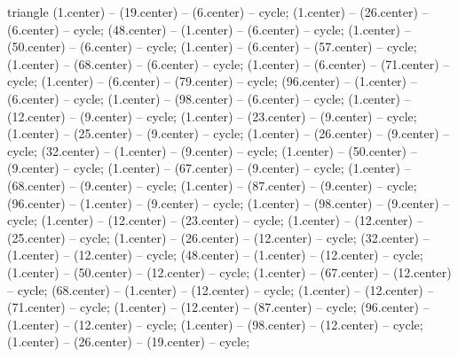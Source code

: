 \begin{pgfonlayer}{triangle} 
 (1.center) -- (19.center) -- (6.center) -- cycle; 
 (1.center) -- (26.center) -- (6.center) -- cycle; 
 (48.center) -- (1.center) -- (6.center) -- cycle; 
 (1.center) -- (50.center) -- (6.center) -- cycle; 
 (1.center) -- (6.center) -- (57.center) -- cycle; 
 (1.center) -- (68.center) -- (6.center) -- cycle; 
 (1.center) -- (6.center) -- (71.center) -- cycle; 
 (1.center) -- (6.center) -- (79.center) -- cycle; 
 (96.center) -- (1.center) -- (6.center) -- cycle; 
 (1.center) -- (98.center) -- (6.center) -- cycle; 
 (1.center) -- (12.center) -- (9.center) -- cycle; 
 (1.center) -- (23.center) -- (9.center) -- cycle; 
 (1.center) -- (25.center) -- (9.center) -- cycle; 
 (1.center) -- (26.center) -- (9.center) -- cycle; 
 (32.center) -- (1.center) -- (9.center) -- cycle; 
 (1.center) -- (50.center) -- (9.center) -- cycle; 
 (1.center) -- (67.center) -- (9.center) -- cycle; 
 (1.center) -- (68.center) -- (9.center) -- cycle; 
 (1.center) -- (87.center) -- (9.center) -- cycle; 
 (96.center) -- (1.center) -- (9.center) -- cycle; 
 (1.center) -- (98.center) -- (9.center) -- cycle; 
 (1.center) -- (12.center) -- (23.center) -- cycle; 
 (1.center) -- (12.center) -- (25.center) -- cycle; 
 (1.center) -- (26.center) -- (12.center) -- cycle; 
 (32.center) -- (1.center) -- (12.center) -- cycle; 
 (48.center) -- (1.center) -- (12.center) -- cycle; 
 (1.center) -- (50.center) -- (12.center) -- cycle; 
 (1.center) -- (67.center) -- (12.center) -- cycle; 
 (68.center) -- (1.center) -- (12.center) -- cycle; 
 (1.center) -- (12.center) -- (71.center) -- cycle; 
 (1.center) -- (12.center) -- (87.center) -- cycle; 
 (96.center) -- (1.center) -- (12.center) -- cycle; 
 (1.center) -- (98.center) -- (12.center) -- cycle; 
 (1.center) -- (26.center) -- (19.center) -- cycle; 

\end{pgfonlayer}
